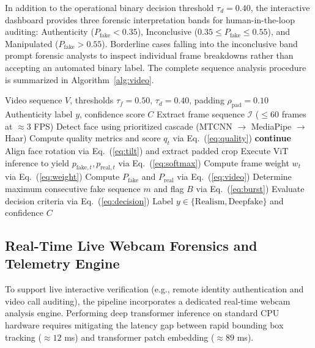 \documentclass[conference]{IEEEtran}
\begin{document}
In addition to the operational binary decision threshold $\tau_d = 0.40$, the interactive dashboard provides three forensic interpretation bands for human-in-the-loop auditing: Authenticity ($P_{\text{fake}} < 0.35$), Inconclusive ($0.35 \le P_{\text{fake}} \le 0.55$), and Manipulated ($P_{\text{fake}} > 0.55$). Borderline cases falling into the inconclusive band prompt forensic analysts to inspect individual frame breakdowns rather than accepting an automated binary label. The complete sequence analysis procedure is summarized in Algorithm~\ref{alg:video}.

\begin{algorithm}[t]
\caption{Video-Level Deepfake Decision Procedure}
\label{alg:video}
\begin{algorithmic}[1]
\footnotesize
\Require Video sequence $V$, thresholds $\tau_f = 0.50$, $\tau_d = 0.40$, padding $\rho_{\text{pad}} = 0.10$
\Ensure Authenticity label $y$, confidence score $C$
\State Extract frame sequence $\mathcal{I}$ ($\le 60$ frames at $\approx 3$ FPS)
  \State Detect face using prioritized cascade (MTCNN $\rightarrow$ MediaPipe $\rightarrow$ Haar)
    \State Compute quality metrics and score $q_t$ via Eq.~(\ref{eq:quality})
      \State \textbf{continue} 
    \EndIf
    \State Align face rotation via Eq.~(\ref{eq:tilt}) and extract padded crop
    \State Execute ViT inference to yield $p_{\text{fake}, t}, p_{\text{real}, t}$ via Eq.~(\ref{eq:softmax})
    \State Compute frame weight $w_t$ via Eq.~(\ref{eq:weight})
  \EndIf
\EndFor
\State Compute $P_{\text{fake}}$ and $P_{\text{real}}$ via Eq.~(\ref{eq:video})
\State Determine maximum consecutive fake sequence $m$ and flag $B$ via Eq.~(\ref{eq:burst})
\State Evaluate decision criteria via Eq.~(\ref{eq:decision})
\State \Return Label $y \in \{\text{Realism}, \text{Deepfake}\}$ and confidence $C$
\end{algorithmic}
\end{algorithm}

\subsection{Real-Time Live Webcam Forensics and Telemetry Engine}
To support live interactive verification (e.g., remote identity authentication and video call auditing), the pipeline incorporates a dedicated real-time webcam analysis engine. Performing deep transformer inference on standard CPU hardware requires mitigating the latency gap between rapid bounding box tracking ($\approx 12$ ms) and transformer patch embedding ($\approx 89$ ms).
\end{document}

